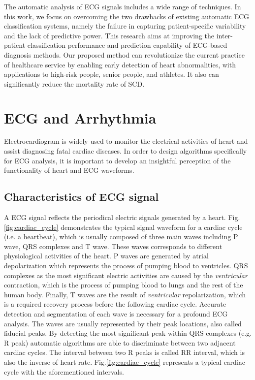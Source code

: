 The automatic analysis of ECG signals includes a wide range of techniques. In this work, we focus on overcoming the two drawbacks of existing automatic ECG classification systems, namely the failure in capturing patient-specific variability and the lack of predictive power.%
This research aims at improving the inter-patient classification performance and prediction capability of ECG-based diagnosis methods. Our proposed method can revolutionize the current practice of healthcare service by enabling early detection of heart abnormalities, with applications to high-risk people, senior people, and athletes. It also can significantly reduce the mortality rate of SCD. %

\section{ECG and Arrhythmia}

Electrocardiogram is widely used to monitor the electrical activities of heart and assist diagnosing fatal cardiac diseases. In order to design algorithms specifically for ECG analysis, it is important to develop an insightful perception of the functionality of heart and ECG waveforms.  

\subsection{Characteristics of ECG signal}

A ECG signal reflects the periodical electric signals generated by a heart. Fig.\ref{fig:cardiac_cycle} demonstrates the typical signal waveform for a cardiac cycle (i.e. a heartbeat), which is usually composed of three main waves including P wave, QRS complexes and T wave. These waves corresponds to different physiological activities of the heart. P waves are generated by atrial depolarization which represents the process of pumping blood to ventricles. QRS complexes as the most significant electric activities are caused by the \textit{ventricular} contraction, which is the process of pumping blood to lungs and the rest of the human body. Finally, T waves are the result of \textit{ventricular} repolarization, which is a required recovery process before the following cardiac cycle. Accurate detection and segmentation of each wave is necessary for a profound ECG analysis. The waves are usually represented by their peak locations, also called fiducial peaks. By detecting the most significant peak within QRS complexes (e.g. R peak) automatic algorithms are able to discriminate between two adjacent cardiac cycles. The interval between two R peaks is called RR interval, which is also the inverse of heart rate. Fig.\ref{fig:cardiac_cycle} represents a typical cardiac cycle with the aforementioned intervals.

